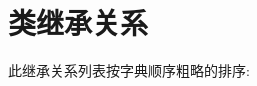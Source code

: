 \section{类继承关系}
此继承关系列表按字典顺序粗略的排序\+: \begin{DoxyCompactList}
\item {}
\begin{DoxyCompactList}
\item {}
\end{DoxyCompactList}
\end{DoxyCompactList}
